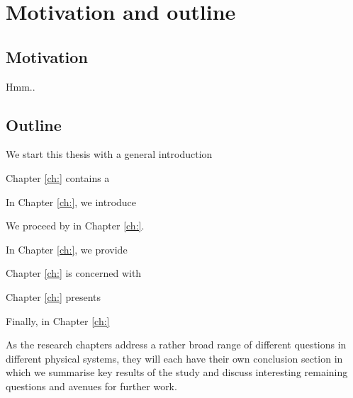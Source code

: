 \chapter{Motivation and outline} 
\label{ch:Motivation}

\section{Motivation}

Hmm.. 

\section{Outline}

We start this thesis with a general introduction 

Chapter \ref{ch:} contains a 

In Chapter \ref{ch:}, we introduce 

We proceed by  in Chapter \ref{ch:}. 

In Chapter \ref{ch:}, we provide 

Chapter \ref{ch:} is concerned with 

Chapter \ref{ch:} presents 

Finally, in Chapter \ref{ch:} 

As the research chapters address a rather broad range of different questions in different physical systems, they will each have their own conclusion section in which we summarise key results of the study and discuss interesting remaining questions and avenues for further work.


